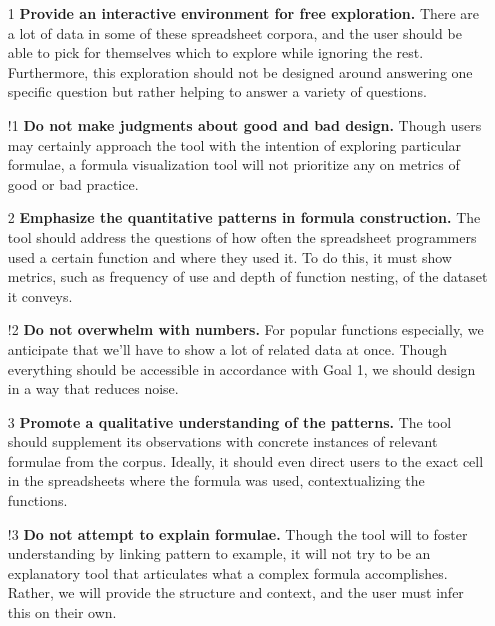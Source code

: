 \documentclass[conference]{IEEEtran}
\begin{document}
	\begin{itemize}
		
		\item [1] \textbf{Provide an interactive environment for free exploration.}
		There are a lot of data in some of these spreadsheet corpora, and the user
		should be able to pick for themselves which to explore while ignoring the
		rest. Furthermore, this exploration should not be designed around answering
		one specific question but rather helping to answer a variety of questions.
		
		\item [!1] \textbf{Do not make judgments about good and bad design.} Though
		users may certainly approach the tool with the intention of exploring
		particular formulae, a formula visualization tool will not prioritize any on
		metrics of good or bad practice.
		
		\item [2] \textbf{Emphasize the quantitative patterns in formula
			construction.} The tool should address the questions of how often the
		spreadsheet programmers used a certain function and where they used it. To do
		this, it must show metrics, such as frequency of use and depth of function
		nesting, of the dataset it conveys.
		
		\item [!2] \textbf{Do not overwhelm with numbers.} For popular functions
		especially, we anticipate that we'll have to show a lot of related data at
		once. Though everything should be accessible in accordance with Goal 1, we
		should design in a way that reduces noise.
		
		\item [3] \textbf{Promote a qualitative understanding of the patterns.} The
		tool should supplement its observations with concrete instances of relevant
		formulae from the corpus. Ideally, it should even direct users to the exact
		cell in the spreadsheets where the formula was used, contextualizing the
		functions.
		
		\item [!3] \textbf{Do not attempt to explain formulae.} Though the tool will
		to foster understanding by linking pattern to example, it will not try to be
		an explanatory tool that articulates what a complex formula accomplishes. Rather,
		we will provide the structure and context, and the user	must infer this on their own.
		
	\end{itemize}
	
\end{document}
